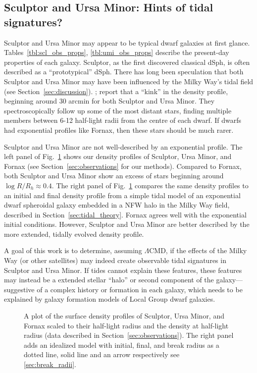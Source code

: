 \subsection{Sculptor and Ursa Minor: Hints of tidal
signatures?}\label{sculptor-and-ursa-minor-hints-of-tidal-signatures}

Sculptor and Ursa Minor may appear to be typical dwarf galaxies at first
glance. Tables~\ref{tbl:scl_obs_props}, \ref{tbl:umi_obs_props} describe
the present-day properties of each galaxy. Sculptor, as the first
discovered classical dSph, is often described as a ``prototypical''
dSph. There has long been speculation that both Sculptor and Ursa Minor
may have been influenced by the Milky Way's tidal field (see
Section~\ref{sec:discussion}). \citet{sestito+2023a};
\citet{sestito+2023b} report that a ``kink'' in the density profile,
beginning around 30 arcmin for both Sculptor and Ursa Minor. They
spectroscopically follow up some of the most distant stars, finding
multiple members between 6-12 half-light radii from the centre of each
dwarf. If dwarfs had exponential profiles like Fornax, then these stars
should be much rarer.

Sculptor and Ursa Minor are not well-described by an exponential
profile. The left panel of Fig.~\ref{fig:scl_umi_vs_penarrubia} shows
our density profiles of Sculptor, Ursa Minor, and Fornax (see
Section~\ref{sec:observations} for our methods). Compared to Fornax,
both Sculptor and Ursa Minor show an excess of stars beginning around
\(\log R/R_h\approx 0.4\). The right panel of
Fig.~\ref{fig:scl_umi_vs_penarrubia} compares the same density profiles
to an initial and final density profile from a simple tidal model of an
exponential dwarf spheroidal galaxy embedded in a NFW halo in the Milky
Way field, described in Section~\ref{sec:tidal_theory}. Fornax agrees
well with the exponential initial conditions. However, Sculptor and Ursa
Minor are better described by the more extended, tidally evolved density
profile.

A goal of this work is to determine, assuming \(\Lambda\)CMD, if the
effects of the Milky Way (or other satellites) may indeed create
observable tidal signatures in Sculptor and Ursa Minor. If tides cannot
explain these features, these features may instead be a extended stellar
``halo'' or second component of the galaxy---suggestive of a complex
history or formation in each galaxy, which needs to be explained by
galaxy formation models of Local Group dwarf galaxies.

\begin{figure}
\centering
{}
\caption[Sculptor and Ursa Minor match tidal models]{A plot of the
surface density profiles of Sculptor, Ursa Minor, and Fornax scaled to
their half-light radius and the density at half-light radius (data
described in Section~\ref{sec:observations}). The right panel adds an
idealized model with initial, final, and break radius as a dotted line,
solid line and an arrow respectively see
\ref{sec:break_radii}.}\label{fig:scl_umi_vs_penarrubia}
\end{figure}


